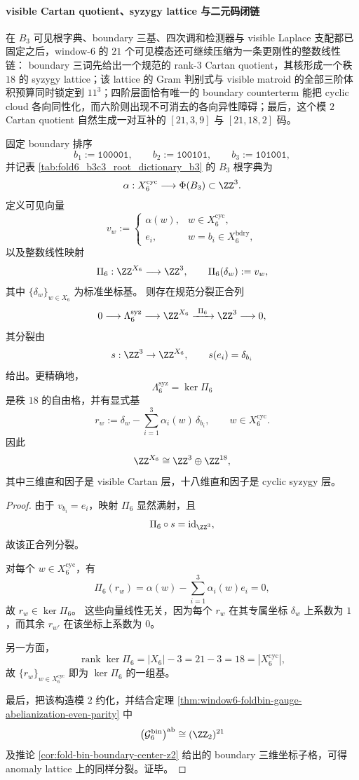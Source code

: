 \paragraph{visible Cartan quotient、syzygy lattice 与二元码闭链}
在 \(B_3\) 可见根字典、boundary 三基、四次调和检测器与 visible Laplace 支配都已固定之后，window-\(6\) 的 \(21\) 个可见模态还可继续压缩为一条更刚性的整数线性链：
boundary 三词先给出一个规范的 rank-\(3\) Cartan quotient，其核形成一个秩 \(18\) 的 syzygy lattice；该 lattice 的 Gram 判别式与 visible matroid 的全部三阶体积预算同时锁定到 \(11^3\)；四阶层面恰有唯一的 boundary counterterm 能把 cyclic cloud 各向同性化，而六阶则出现不可消去的各向异性障碍；最后，这个模 \(2\) Cartan quotient 自然生成一对互补的 \([21,3,9]\) 与 \([21,18,2]\) 码。

\begin{theorem}\label{thm:window6-visible-cartan-quotient-syzygy-splitting}
固定 boundary 排序
\[
b_1:=\texttt{100001},
\qquad
b_2:=\texttt{100101},
\qquad
b_3:=\texttt{101001},
\]
并记表 \ref{tab:fold6_b3c3_root_dictionary_b3} 的 \(B_3\) 根字典为
\[
\alpha:X_6^{\mathrm{cyc}}\longrightarrow \Phi(B_3)\subset \ZZ^3.
\]
定义可见向量
\[
v_w:=
\begin{cases}
\alpha(w),& w\in X_6^{\mathrm{cyc}},\\
e_i,& w=b_i\in X_6^{\mathrm{bdry}},
\end{cases}
\]
以及整数线性映射
\[
\Pi_6:\ZZ^{X_6}\longrightarrow \ZZ^3,
\qquad
\Pi_6(\delta_w):=v_w,
\]
其中 \(\{\delta_w\}_{w\in X_6}\) 为标准坐标基。
则存在规范分裂正合列
\[
0\longrightarrow \Lambda_6^{\mathrm{syz}}
\longrightarrow \ZZ^{X_6}
\xrightarrow{\ \Pi_6\ }
\ZZ^3
\longrightarrow 0,
\]
其分裂由
\[
s:\ZZ^3\to \ZZ^{X_6},
\qquad
s(e_i)=\delta_{b_i}
\]
给出。更精确地，
\[
\Lambda_6^{\mathrm{syz}}=\ker \Pi_6
\]
是秩 \(18\) 的自由格，并有显式基
\[
r_w:=\delta_w-\sum_{i=1}^{3}\alpha_i(w)\,\delta_{b_i},
\qquad
w\in X_6^{\mathrm{cyc}}.
\]
因此
\[
\ZZ^{X_6}\cong \ZZ^3\oplus \ZZ^{18},
\]
其中三维直和因子是 visible Cartan 层，十八维直和因子是 cyclic syzygy 层。
\end{theorem}
\begin{proof}
由于 \(v_{b_i}=e_i\)，映射 \(\Pi_6\) 显然满射，且
\[
\Pi_6\circ s=\mathrm{id}_{\ZZ^3},
\]
故该正合列分裂。

对每个 \(w\in X_6^{\mathrm{cyc}}\)，有
\[
\Pi_6(r_w)
=
\alpha(w)-\sum_{i=1}^{3}\alpha_i(w)e_i
=
0,
\]
故 \(r_w\in \ker \Pi_6\)。
这些向量线性无关，因为每个 \(r_w\) 在其专属坐标 \(\delta_w\) 上系数为 \(1\)，而其余 \(r_{w'}\) 在该坐标上系数为 \(0\)。

另一方面，
\[
\operatorname{rank}\ker \Pi_6
=
|X_6|-3
=
21-3
=
18
=
|X_6^{\mathrm{cyc}}|,
\]
故 \(\{r_w\}_{w\in X_6^{\mathrm{cyc}}}\) 即为 \(\ker \Pi_6\) 的一组基。

最后，把该构造模 \(2\) 约化，并结合定理 \ref{thm:window6-foldbin-gauge-abelianization-even-parity} 中
\[
\bigl(\mathcal G_6^{\mathrm{bin}}\bigr)^{\mathrm{ab}}\cong (\ZZ_2)^{21}
\]
及推论 \ref{cor:fold-bin-boundary-center-z2} 给出的 boundary 三维坐标子格，可得 anomaly lattice 上的同样分裂。证毕。
\end{proof}

